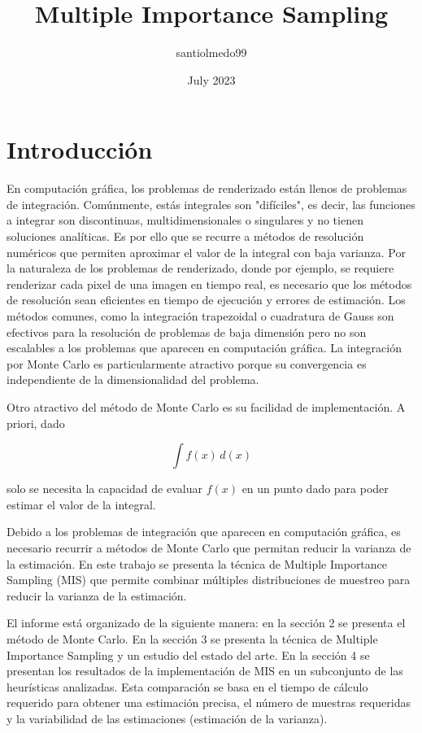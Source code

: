 \documentclass{article}
\title{Multiple Importance Sampling}
\author{santiolmedo99}
\date{July 2023}
\begin{document}
\maketitle

\section{Introducción}

En computación gráfica, los problemas de renderizado están llenos de problemas de integración.
Comúnmente, estás integrales son "difíciles", es decir, las funciones a integrar son discontinuas, multidimensionales o singulares y no tienen soluciones analíticas.
Es por ello que se recurre a métodos de resolución numéricos que permiten aproximar el valor de la integral con baja varianza.
Por la naturaleza de los problemas de renderizado, donde por ejemplo, se requiere renderizar cada pixel de una imagen en tiempo real, es necesario que los métodos de resolución sean eficientes en tiempo de ejecución y errores de estimación.
Los métodos comunes, como la integración trapezoidal o cuadratura de Gauss son efectivos para la resolución de problemas de baja dimensión pero no son escalables a los problemas que aparecen en computación gráfica.
La integración por Monte Carlo es particularmente atractivo porque su convergencia es independiente de la dimensionalidad del problema.

Otro atractivo del método de Monte Carlo es su facilidad de implementación. A priori, dado

$$ \int f(x) \,d(x)$$

solo se necesita la capacidad de evaluar $f(x)$ en un punto dado para poder estimar el valor de la integral.

Debido a los problemas de integración que aparecen en computación gráfica, es necesario recurrir a métodos de Monte Carlo que permitan reducir la varianza de la estimación.
En este trabajo se presenta la técnica de Multiple Importance Sampling (MIS) que permite combinar múltiples distribuciones de muestreo para reducir la varianza de la estimación.

El informe está organizado de la siguiente manera: en la sección 2 se presenta el método de Monte Carlo.
En la sección 3 se presenta la técnica de Multiple Importance Sampling y un estudio del estado del arte.
En la sección 4 se presentan los resultados de la implementación de MIS en un subconjunto de las heurísticas analizadas.
Esta comparación se basa en el tiempo de cálculo requerido para obtener una estimación precisa, el número de muestras requeridas y la variabilidad de las estimaciones (estimación de la varianza).
\end{document}
